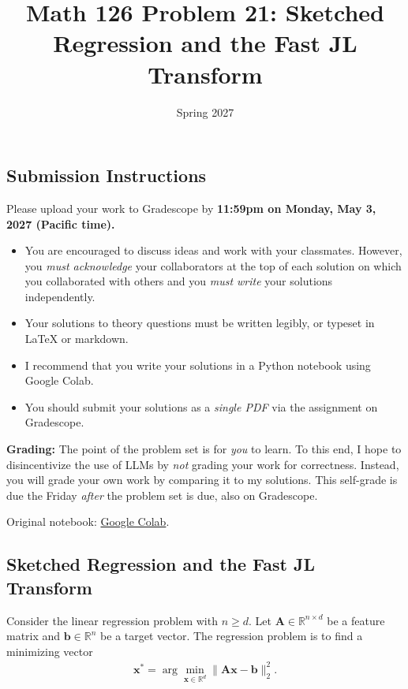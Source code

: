\documentclass{article}
\title{Math 126 Problem 21: Sketched Regression and the Fast JL Transform}
\author{} %
\date{Spring 2027}
\begin{document}
\maketitle

\hypertarget{submission-instructions}{%
\subsection*{Submission Instructions}\label{submission-instructions}}

Please upload your work to Gradescope by \textbf{11:59pm on Monday, May 3, 2027 (Pacific time).}

\begin{itemize}
\item
  You are encouraged to discuss ideas and work with your classmates. However, you \emph{must acknowledge} your collaborators at the top of each solution on which you collaborated with others and you \emph{must write} your solutions independently.
\item
  Your solutions to theory questions must be written legibly, or typeset in LaTeX or markdown.
\item
  I recommend that you write your solutions in a Python notebook using Google Colab.
\item
  You should submit your solutions as a \emph{single PDF} via the assignment on Gradescope.
\end{itemize}

\textbf{Grading:} The point of the problem set is for \emph{you} to learn. To this end, I hope to disincentivize the use of LLMs by \emph{not} grading your work for correctness. Instead, you will grade your own work by comparing it to my solutions. This self-grade is due the Friday \emph{after} the problem set is due, also on Gradescope.

\noindent Original notebook: \href{https://colab.research.google.com/drive/1W2OZ-UWNjreSrctrVbRIce-wItRvGSBZ?usp=sharing}{Google Colab}.

\hypertarget{sketched-regression-and-the-fast-jl-transform}{%
\subsection*{Sketched Regression and the Fast JL Transform}\label{sketched-regression-and-the-fast-jl-transform}}

Consider the linear regression problem with \(n \geq d\). Let \(\mathbf{A} \in \mathbb{R}^{n \times d}\) be a feature matrix and \(\mathbf{b} \in \mathbb{R}^n\) be a target vector. The regression problem is to find a minimizing vector \begin{align*}
\mathbf{x}^* = \arg \min_{\mathbf{x} \in \mathbb{R}^d}
\| \mathbf{Ax} - \mathbf{b} \|_2^2.
\end{align*}
\end{document}
